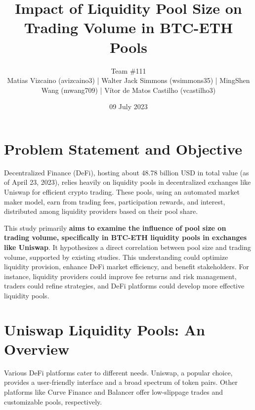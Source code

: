 \documentclass{article}
\makeatletter
\renewcommand{\maketitle}{\bgroup\setlength{\parindent}{0pt}
\begin{center} %
  \Large\@title
  \newline
  \footnotesize\@author
\end{center}
\begin{flushright}
  \@date
\end{flushright}
\egroup}
\makeatother
\begin{document}
\title{Impact of Liquidity Pool Size on Trading Volume in BTC-ETH Pools}
\author{
  Team \#111 \\
   \scriptsize Matias Vizcaino (avizcaino3) | Walter Jack Simmons (wsimmons35) | MingShen Wang (mwang709) | Vítor de Matos Castilho (vcastilho3)
}
\date{09 July 2023}
\maketitle

\noindent


\section*{\textbf{Problem Statement and Objective}}

Decentralized Finance (DeFi), hosting about 48.78 billion USD in total value (as of April 23, 2023\cite{defillama}), relies heavily on liquidity pools in decentralized exchanges like Uniswap for efficient crypto trading. These pools, using an automated market maker model, earn from trading fees, participation rewards, and interest, distributed among liquidity providers based on their pool share\cite{defi-characterisation-2023,impermanentloss2023,yield_farming_protocols}.

This study primarily \textbf{aims to examine the influence of pool size on trading volume, specifically in BTC-ETH liquidity pools in exchanges like Uniswap}. It hypothesizes a direct correlation between pool size and trading volume, supported by existing studies\cite{defi-characterisation-2023,risks_returns_uniswap}. This understanding could optimize liquidity provision, enhance DeFi market efficiency, and benefit stakeholders. For instance, liquidity providers could improve fee returns and risk management, traders could refine strategies, and DeFi platforms could develop more effective liquidity pools\cite{makarov2021cryptocurrencies,defi2023uniswap}.

\section*{\textbf{Uniswap Liquidity Pools: An Overview}}

Various DeFi platforms cater to different needs. Uniswap, a popular choice, provides a user-friendly interface and a broad spectrum of token pairs. Other platforms like Curve Finance and Balancer offer low-slippage trades and customizable pools, respectively\cite{yield_farming_protocols}.
\end{document}
